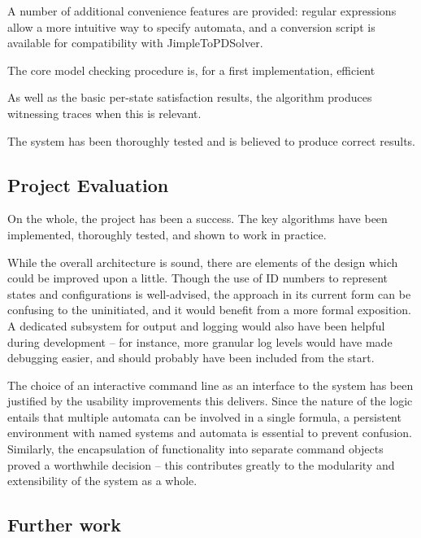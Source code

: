 \documentclass[11pt]{article}
\theoremstyle{definition}
\begin{document}
A number of additional convenience features are provided: regular expressions
allow a more intuitive way to specify automata, and a conversion script is
available for compatibility with JimpleToPDSolver. 

The core model checking procedure is, for a first implementation, efficient

As well as the basic per-state satisfaction results, the algorithm produces
witnessing traces when this is relevant.

The system has been thoroughly tested and is believed to produce correct results.




\subsection{Project Evaluation}

On the whole, the project has been a success. The key algorithms have been
implemented, thoroughly tested, and shown to work in practice.

While the overall architecture is sound, there are elements of the design which
could be improved upon a little. Though the use of ID numbers to represent
states and configurations is well-advised, the approach in its current form can
be confusing to the uninitiated, and it would benefit from a more formal
exposition. A dedicated subsystem for output and logging would also have been
helpful during development -- for instance, more granular log levels would have
made debugging easier, and should probably have been included from the start.

The choice of an interactive command line as an interface to the system has
been justified by the usability improvements this delivers. Since the nature of
the logic entails that multiple automata can be involved in a single formula, a
persistent environment with named systems and automata is essential to prevent
confusion. Similarly, the encapsulation of functionality into separate command
objects proved a worthwhile decision -- this contributes greatly to the
modularity and extensibility of the system as a whole.


\subsection{Further work}
\end{document}
